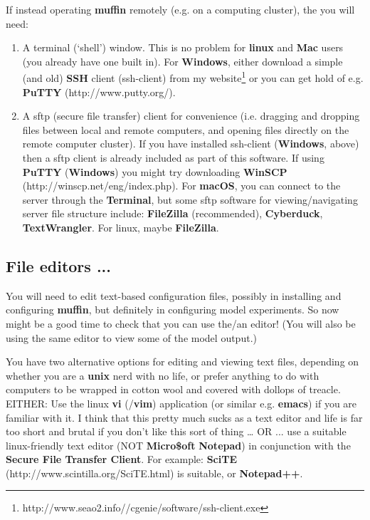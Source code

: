 \documentclass[11pt,fleqn]{book} %
\begin{document}
\noindent If instead operating \textbf{muffin} remotely (e.g. on a computing cluster), the you  will need:

\begin{enumerate}[noitemsep]
\setlength{\itemindent}{.2in}
\item A terminal (‘shell’) window. This is no problem for \textbf{linux} and \textbf{Mac} users (you already have one built in). For \textbf{Windows}, either download a simple (and old) \textbf{SSH} client (ssh-client) from my website\footnote{http://www.seao2.info//cgenie/software/ssh-client.exe} or you can get hold of e.g. \textbf{PuTTY} (http://www.putty.org/).
\item A sftp (secure file transfer) client for convenience (i.e. dragging and dropping files between local and remote computers, and opening files directly on the remote computer cluster). If you have installed ssh-client (\textbf{Windows}, above) then a sftp client is already included as part of this software. If using \textbf{PuTTY} (\textbf{Windows}) you might try downloading \textbf{WinSCP} (http://winscp.net/eng/index.php). For \textbf{macOS}, you can connect to the server through the \textbf{Terminal}, but some sftp software for viewing/navigating server file structure include: \textbf{FileZilla} (recommended), \textbf{Cyberduck}, \textbf{TextWrangler}. For linux, maybe \textbf{FileZilla}.
\end{enumerate}


\subsection*{File editors ...}

You will need to edit text-based configuration files, possibly in installing and configuring \textbf{muffin}, but definitely in configuring model experiments. So now might be a good time to check that you can use the/an editor! (You will also be using the same editor to view some of the model output.)

You have two alternative options for editing and viewing text files, depending on whether you are a \textbf{unix} nerd with no life, or prefer anything to do with computers to be wrapped in cotton wool and covered with dollops of treacle.
EITHER: Use the linux \textbf{vi} (/\textbf{vim}) application (or similar e.g. \textbf{emacs}) if you are familiar with it. I think that this pretty much sucks as a text editor and life is far too short and brutal if you don't like this sort of thing … OR ... use a suitable linux-friendly text editor (NOT \textbf{Micro\$oft} \textbf{Notepad}) in conjunction with the \textbf{Secure File Transfer Client}. For example: \textbf{SciTE} (http://www.scintilla.org/SciTE.html) is suitable, or \textbf{Notepad++}.
\end{document}
